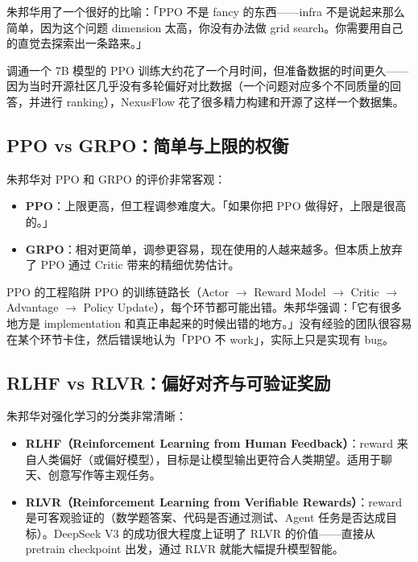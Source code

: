\documentclass[a4paper]{article}
\begin{document}
朱邦华用了一个很好的比喻：「PPO 不是 fancy 的东西——infra 不是说起来那么简单，因为这个问题 dimension 太高，你没有办法做 grid search。你需要用自己的直觉去探索出一条路来。」

调通一个 7B 模型的 PPO 训练大约花了一个月时间，但准备数据的时间更久——因为当时开源社区几乎没有多轮偏好对比数据（一个问题对应多个不同质量的回答，并进行 ranking），NexusFlow 花了很多精力构建和开源了这样一个数据集。

\subsection{PPO vs GRPO：简单与上限的权衡}

朱邦华对 PPO 和 GRPO 的评价非常客观：

\begin{itemize}
\item \textbf{PPO}：上限更高，但工程调参难度大。「如果你把 PPO 做得好，上限是很高的。」
\item \textbf{GRPO}：相对更简单，调参更容易，现在使用的人越来越多。但本质上放弃了 PPO 通过 Critic 带来的精细优势估计。
\end{itemize}

\begin{warningbox}{PPO 的工程陷阱}
PPO 的训练链路长（Actor $\rightarrow$ Reward Model $\rightarrow$ Critic $\rightarrow$ Advantage $\rightarrow$ Policy Update），每个环节都可能出错。朱邦华强调：「它有很多地方是 implementation 和真正串起来的时候出错的地方。」没有经验的团队很容易在某个环节卡住，然后错误地认为「PPO 不 work」，实际上只是实现有 bug。
\end{warningbox}

\subsection{RLHF vs RLVR：偏好对齐与可验证奖励}

朱邦华对强化学习的分类非常清晰：

\begin{itemize}
\item \textbf{RLHF（Reinforcement Learning from Human Feedback）}：reward 来自人类偏好（或偏好模型），目标是让模型输出更符合人类期望。适用于聊天、创意写作等主观任务。
\item \textbf{RLVR（Reinforcement Learning from Verifiable Rewards）}：reward 是可客观验证的（数学题答案、代码是否通过测试、Agent 任务是否达成目标）。DeepSeek V3 的成功很大程度上证明了 RLVR 的价值——直接从 pretrain checkpoint 出发，通过 RLVR 就能大幅提升模型智能。
\end{itemize}
\end{document}
